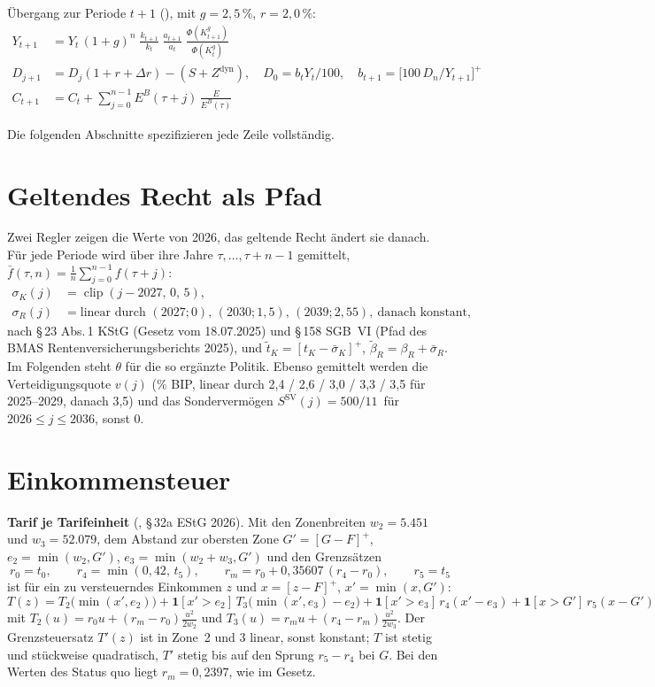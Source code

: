 Übergang zur Periode $t+1$ (), mit $g=2{,}5\,\%$, $r=2{,}0\,\%$:
\begin{align}
Y_{t+1} &= Y_t\,(1+g)^{n}\;\frac{k_{t+1}}{k_t}\;\frac{a_{t+1}}{a_t}\;\frac{\Phi(K^g_{t+1})}{\Phi(K^g_t)}\\
D_{j+1} &= D_j(1+r+\Delta r) - (S+Z^{\text{dyn}}),\quad D_0=b_tY_t/100,\quad b_{t+1}=\bigl[100\,D_n/Y_{t+1}\bigr]^+\\
C_{t+1} &= C_t + \sum_{j=0}^{n-1} E^B(\tau+j)\,\frac{E}{E^B(\tau)}
\end{align}

Die folgenden Abschnitte spezifizieren jede Zeile vollständig.

\section{Geltendes Recht als Pfad}

Zwei Regler zeigen die Werte von 2026, das geltende Recht ändert sie danach. Für jede Periode
wird über ihre Jahre $\tau,\dots,\tau+n-1$ gemittelt, $\bar f(\tau,n)=\frac1n\sum_{j=0}^{n-1}f(\tau+j)$:
\begin{align}
\sigma_K(j) &= \operatorname{clip}(j-2027,\,0,\,5),\\
\sigma_R(j) &= \text{linear durch } (2027;0),\,(2030;1{,}5),\,(2039;2{,}55),\ \text{danach konstant},
\end{align}
nach \S\,23 Abs.\,1 KStG (Gesetz vom 18.07.2025) und \S\,158 SGB~VI (Pfad des BMAS
Rentenversicherungsberichts 2025),
und $\tilde t_K=[t_K-\bar\sigma_K]^+$, $\tilde\beta_R=\beta_R+\bar\sigma_R$. Im Folgenden steht
$\theta$ für die so ergänzte Politik. Ebenso gemittelt werden die Verteidigungsquote
$v(j)$ (\% BIP, linear durch 2,4 / 2,6 / 3,0 / 3,3 / 3,5 für 2025--2029, danach 3,5) und das
Sondervermögen $S^{\text{SV}}(j)=500/11$\,\Mrd{} für $2026\le j\le 2036$, sonst 0.

\section{Einkommensteuer}
\label{sec:est}

\textbf{Tarif je Tarifeinheit} (, \S\,32a EStG 2026). Mit den
Zonenbreiten $w_2=5.451$ und $w_3=52.079$, dem Abstand zur obersten Zone $G'=[G-F]^+$,
$e_2=\min(w_2,G')$, $e_3=\min(w_2+w_3,G')$ und den Grenzsätzen
\begin{equation}
r_0=t_0,\qquad r_4=\min(0{,}42,\,t_5),\qquad r_m=r_0+0{,}35607\,(r_4-r_0),\qquad r_5=t_5
\end{equation}
ist für ein zu versteuerndes Einkommen $z$ und $x=[z-F]^+$, $x'=\min(x,G')$:
\begin{equation}
T(z)=T_2\bigl(\min(x',e_2)\bigr)+\mathbf 1[x'>e_2]\,T_3\bigl(\min(x',e_3)-e_2\bigr)
     +\mathbf 1[x'>e_3]\,r_4(x'-e_3)+\mathbf 1[x>G']\,r_5(x-G')
\end{equation}
mit $T_2(u)=r_0u+(r_m-r_0)\frac{u^2}{2w_2}$ und $T_3(u)=r_mu+(r_4-r_m)\frac{u^2}{2w_3}$. Der
Grenzsteuersatz $T'(z)$ ist in Zone~2 und 3 linear, sonst konstant; $T$ ist stetig und
stückweise quadratisch, $T'$ stetig bis auf den Sprung $r_5-r_4$ bei $G$. Bei den Werten
des Status quo liegt $r_m=0{,}2397$, wie im Gesetz.

